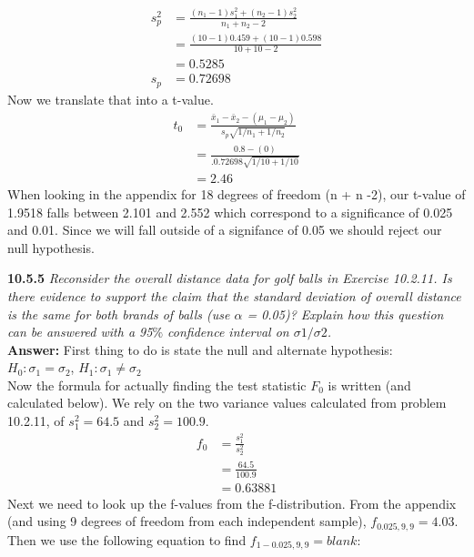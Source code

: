 \documentclass[11pt]{article}
\begin{document}
\begin{enumerate}
\begin{equation}
\begin{split}
s_p^2 &= \frac{(n_1-1)s_1^2 + (n_2 - 1)s_2^2}{n_1 + n_2 -2} \\
&= \frac{(10 - 1)0.459 + (10 -1)0.598}{10+10-2}\\
&=0.5285\\
s_p &= 0.72698
\end{split}
\end{equation}
Now we translate that into a t-value.
\begin{equation}
\begin{split}
t_0 &= \frac{\bar{x}_1 - \bar{x}_2 - (\mu_1 - \mu_2)}{s_p\sqrt{1/n_1 + 1/n_2}} \\
&=\frac{0.8   - (0)}{.0.72698\sqrt{1/10 + 1/10}} \\
&=2.46
\end{split}
\end{equation}
When looking in the appendix for 18 degrees of freedom (n + n -2), our t-value of 1.9518 falls between 2.101 and 2.552 which correspond to a significance of 0.025 and 0.01. Since we will fall outside of a signifance of 0.05 we should reject our null hypothesis.
\end{enumerate}
\noindent \textbf{10.5.5} \emph{Reconsider the overall distance data for golf balls in Exercise 10.2.11. Is there evidence to support the claim that the standard deviation of overall distance is the same for both brands of balls (use $\alpha$ = 0.05)? Explain how this question can be answered with a 95$\%$ confidence interval on $\sigma1/\sigma2$.}
\\\textbf{Answer:} First thing to do is state the null and alternate hypothesis:
\\$H_0: \sigma_1 = \sigma_2$, $H_1: \sigma_1 \neq \sigma_2$\\
Now the formula for actually finding the test statistic $F_0$ is written (and calculated below). We rely on the two variance values calculated from problem 10.2.11, of $s_1^2 = 64.5$ and $s_2^2 = 100.9$.
\begin{equation}
\begin{split}
f_0 &= \frac{s_1^2}{s_2^2} \\
&= \frac{64.5}{100.9} \\
&= 0.63881
\end{split}
\end{equation}
Next we need to look up the f-values from the f-distribution. From the appendix (and using 9 degrees of freedom from each independent sample), $f_{0.025, 9, 9} = 4.03$. Then we use the following equation to find $f_{1-0.025, 9, 9} = blank$:
\end{document}
